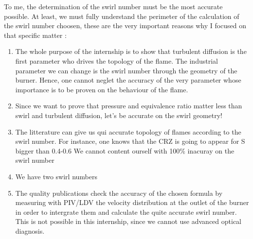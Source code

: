To me, the determination of the swirl number must be the most accurate possible. At least, we must fully understand the perimeter of the calculation of the swirl number choosen, these are the very important reasons why I focused on that specific matter :
\begin{enumerate}
\item The whole purpose of the internship is to show that turbulent diffusion is the first parameter who drives the topology of the flame. The industrial parameter we can change is the swirl number through the geometry of the burner. Hence, one cannot neglet the accuracy of the very parameter whose importance is to be proven on the behaviour of the flame.
\item Since we want to prove that pressure and equivalence ratio matter less than swirl and turbulent diffusion, let's be accurate on the swirl geometry!
\item The litterature can give us qui accurate topology of flames according to the swirl number. For instance, one knows that the CRZ is going to appear for S bigger than 0.4-0.6 We cannot content ourself with 100\% inacuray on the swirl number
\item We have two swirl numbers
\item The quality publications check the accuracy of the chosen formula by measuring with PIV/LDV the velocity distribution at the outlet of the burner in order to intergrate them and calculate the quite accurate swirl number. This is not possible in this internship, since we cannot use advanced optical diagnosis.
\end{enumerate}



 




